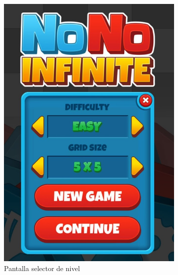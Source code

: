 \begin{figure}[h!]
   \centering
   \begin{subfigure}[b]{0.49\linewidth}
     \includegraphics[width=\linewidth]{images/infinite1.png}
     \caption{Pantalla selector de nivel}
     \label{fig:infinite1-1}
   \end{subfigure}
   \begin{subfigure}[b]{0.49\linewidth}

\end{subfigure}
\end{figure}
